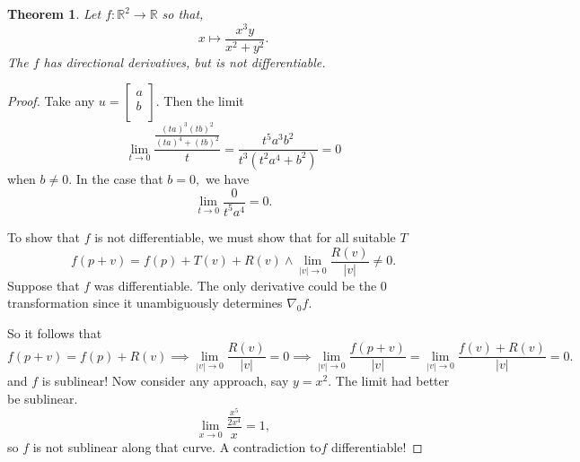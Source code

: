 \documentclass[letter]{article}
\newtheorem{theorem}{Theorem}
\newenvironment{menumerate}{%
  \edef\backupindent{\the\parindent}%
  \enumerate%
  \setlength{\parindent}{\backupindent}%
}{\endenumerate}
\begin{document}
\begin{menumerate}
\begin{menumerate}
            \item \begin{theorem}
                Let $f:\mathbb{R}^2 \to\mathbb{R}$ so that,
                \begin{equation}
                    x \mapsto \frac{x^3y}{x^2 + y^2}.
                \end{equation}
                The $f$ has directional derivatives, but is not differentiable.
            \end{theorem}
            \begin{proof}
                Take any $u = \begin{bmatrix}
                    a \\
                    b \\
                \end{bmatrix}$. Then the limit 
                \begin{equation}
                    \lim_{t\to 0} \frac{\frac{(ta)^3(tb)^2}{(ta)^4 +(tb)^2}}{t} = \frac{t^5a^3b^2}{t^3(t^2a^4+b^2)} = 0
                \end{equation}
                when $b \neq 0.$
                In the case that $b = 0,$ we have
                \begin{equation}
                    \lim_{t\to 0} \frac{0}{t^5a^4} = 0.
                \end{equation}

                To show that $f$ is not differentiable, we must show
                that for all suitable $T$
                \begin{equation}
                    f(p+v) = f(p) + T(v) + R(v) \wedge \lim_{|v| \to 0} \frac{R(v)}{|v|} \neq 0.
                \end{equation}
                Suppose that $f$ was differentiable. The only derivative could be the $0$ transformation since it unambiguously determines $\nabla_0 f.$

                So it follows that
                \begin{equation}
                    f(p+v) = f(p) + R(v) \implies \lim_{|v| \to 0} \frac{R(v)}{|v|} =    0 \implies \lim_{|v| \to 0} \frac{f(p+v)}{|v|} = \lim_{|v| \to 0} \frac{f(v) + R(v)}{|v|} = 0.
                \end{equation}
                and $f$ is sublinear! Now consider any approach, say $y=x^2.$ The limit had better be sublinear.
                \begin{equation}
                    \lim_{x\to 0} \frac{\frac{x^5}{2x^4}}{x}= 1,
                \end{equation}
                so $f$ is not sublinear along that curve. A contradiction to$f$ differentiable!


\end{proof}
\end{menumerate}
\end{menumerate}
\end{document}
